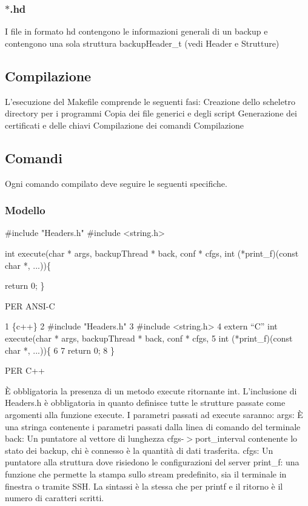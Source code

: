  \subsubsection*{$\ast$.hd}

I file in formato hd contengono le informazioni generali di un backup e contengono una sola struttura backup\+Header\+\_\+t (vedi Header e Strutture)

\subsection*{Compilazione}

L’esecuzione del Makefile comprende le seguenti fasi\+: Creazione dello scheletro directory per i programmi Copia dei file generici e degli script Generazione dei certificati e delle chiavi Compilazione dei comandi Compilazione

\subsection*{Comandi}

Ogni comando compilato deve seguire le seguenti specifiche. \subsubsection*{Modello}


\begin{DoxyCode}
\textcolor{preprocessor}{#include "Headers.h"}
\textcolor{preprocessor}{#include <string.h>}


\textcolor{keywordtype}{int} execute(\textcolor{keywordtype}{char} * args, backupThread * back, conf * cfgs,
\textcolor{keywordtype}{int} (*print\_f)(\textcolor{keyword}{const} \textcolor{keywordtype}{char} *, ...))\{

\textcolor{keywordflow}{return} 0;
\}
\end{DoxyCode}
 P\+ER A\+N\+S\+I-\/C


\begin{DoxyCode}
1 \{c++\}
2 #include "Headers.h"
3 #include <string.h>
4 extern “C” int execute(char * args, backupThread * back, conf * cfgs,
5 int (*print\_f)(const char *, ...))\{
6 
7 return 0;
8 \}
\end{DoxyCode}
 P\+ER C++

È obbligatoria la presenza di un metodo execute ritornante int. L’inclusione di Headers.\+h è obbligatoria in quanto definisce tutte le strutture passate come argomenti alla funzione execute. I parametri passati ad execute saranno\+: args\+: È una stringa contenente i parametri passati dalla linea di comando del terminale back\+: Un puntatore al vettore di lunghezza cfgs-\/$>$port\+\_\+interval contenente lo stato dei backup, chi è connesso è la quantità di dati trasferita. cfgs\+: Un puntatore alla struttura dove risiedono le configurazioni del server print\+\_\+f\+: una funzione che permette la stampa sullo stream predefinito, sia il terminale in finestra o tramite S\+SH. La sintassi è la stessa che per printf e il ritorno è il numero di caratteri scritti.

